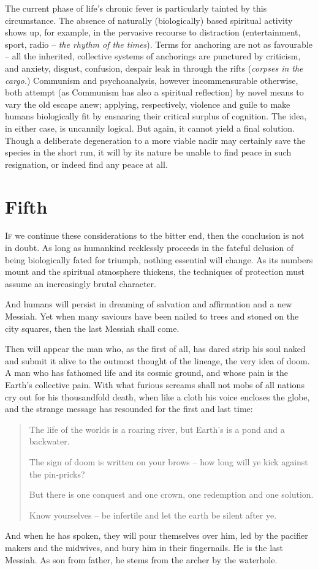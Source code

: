 \documentclass[draft,a4paper,10pt,twocolumn]{article}
\begin{document}
The current phase of life's chronic fever is particularly tainted by this circumstance. The absence of naturally (biologically) based spiritual activity shows up, for example, in the pervasive recourse to distraction (entertainment, sport, radio -- \emph{the rhythm of the times}). Terms for anchoring are not as favourable -- all the inherited, collective systems of anchorings are punctured by criticism, and anxiety, disgust, confusion, despair leak in through the rifts (\emph{corpses in the cargo.}) Communism and psychoanalysis, however incommensurable otherwise, both attempt (as Communism has also a spiritual reflection) by novel means to vary the old escape anew; applying, respectively, violence and guile to make humans biologically fit by ensnaring their critical surplus of cognition. The idea, in either case, is uncannily logical. But again, it cannot yield a final solution. Though a deliberate degeneration to a more viable nadir may certainly save the species in the short run, it will by its nature be unable to find peace in such resignation, or indeed find any peace at all.

\section{Fifth}

\lettrine[lines=2]{I}{f} we continue these considerations to the bitter end, then the conclusion is not in doubt. As long as humankind recklessly proceeds in the fateful delusion of being biologically fated for triumph, nothing essential will change. As its numbers mount and the spiritual atmosphere thickens, the techniques of protection must assume an increasingly brutal character.

And humans will persist in dreaming of salvation and affirmation and a new Messiah. Yet when many saviours have been nailed to trees and stoned on the city squares, then the last Messiah shall come.

Then will appear the man who, as the first of all, has dared strip his soul naked and submit it alive to the outmost thought of the lineage, the very idea of doom. A man who has fathomed life and its cosmic ground, and whose pain is the Earth's collective pain. With what furious screams shall not mobs of all nations cry out for his thousandfold death, when like a cloth his voice encloses the globe, and the strange message has resounded for the first and last time:
\begin{quote}
The life of the worlds is a roaring river, but Earth's is a pond and a backwater.

The sign of doom is written on your brows -- how long will ye kick against the pin-pricks?

But there is one conquest and one crown, one redemption and one solution.

Know yourselves -- be infertile and let the earth be silent after ye.
\end{quote}

And when he has spoken, they will pour themselves over him, led by the pacifier makers and the midwives, and bury him in their fingernails. He is the last Messiah. As son from father, he stems from the archer by the waterhole.
\end{document}
